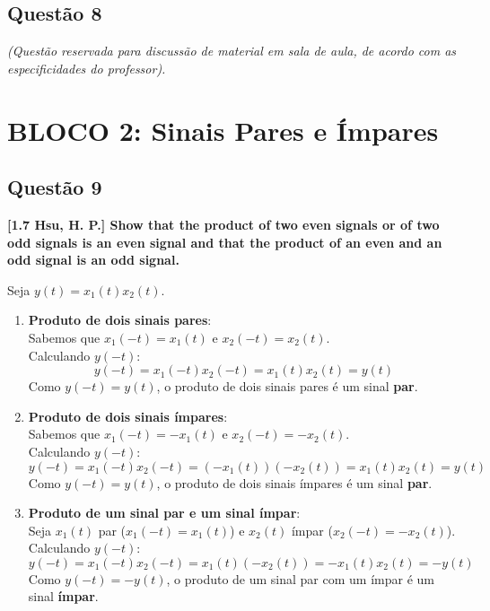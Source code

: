 \subsection{Questão 8}\label{questuxe3o-8}

\emph{(Questão reservada para discussão de material em sala de aula, de acordo com as especificidades do professor).}

\section{BLOCO 2: Sinais Pares e Ímpares}\label{bloco-2-sinais-pares-e-uxedmpares}

\subsection{Questão 9}\label{questuxe3o-9}

\textbf{{[}1.7 Hsu, H. P.{]} Show that the product of two even signals or of two odd signals is an even signal and that the product of an even and an odd signal is an odd signal.}

Seja \(y(t) = x_1(t)x_2(t)\).

\begin{enumerate}
\def\labelenumi{\arabic{enumi}.}
\item
  \textbf{Produto de dois sinais pares}:\\
  Sabemos que \(x_1(-t) = x_1(t)\) e \(x_2(-t) = x_2(t)\).\\
  Calculando \(y(-t)\):
  \[y(-t) = x_1(-t)x_2(-t) = x_1(t)x_2(t) = y(t)\]
  Como \(y(-t) = y(t)\), o produto de dois sinais pares é um sinal \textbf{par}.
\item
  \textbf{Produto de dois sinais ímpares}:\\
  Sabemos que \(x_1(-t) = -x_1(t)\) e \(x_2(-t) = -x_2(t)\).\\
  Calculando \(y(-t)\):
  \[y(-t) = x_1(-t)x_2(-t) = (-x_1(t))(-x_2(t)) = x_1(t)x_2(t) = y(t)\]
  Como \(y(-t) = y(t)\), o produto de dois sinais ímpares é um sinal \textbf{par}.
\item
  \textbf{Produto de um sinal par e um sinal ímpar}:\\
  Seja \(x_1(t)\) par (\(x_1(-t) = x_1(t)\)) e \(x_2(t)\) ímpar (\(x_2(-t) = -x_2(t)\)).\\
  Calculando \(y(-t)\):
  \[y(-t) = x_1(-t)x_2(-t) = x_1(t)(-x_2(t)) = -x_1(t)x_2(t) = -y(t)\]
  Como \(y(-t) = -y(t)\), o produto de um sinal par com um ímpar é um sinal \textbf{ímpar}.
\end{enumerate}

